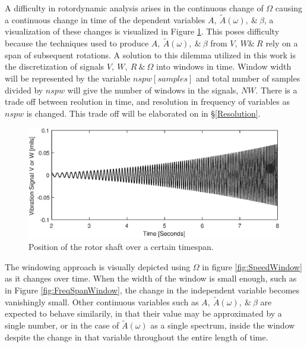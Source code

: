 A difficulty in rotordynamic analysis arises in the continuous change of $ \Omega $ causing a continuous change in time of the dependent variables $ A,\ \tilde{A}(\omega),\ \&\ \beta $, a visualization of these changes is visualized in Figure \ref{fig:PosOverTime}. This poses difficulty because the techniques used to produce $ A,\ \tilde{A}(\omega),\ \&\ \beta $ from $ V,\ W\&\ R $ rely on a span of subsequent rotations. A solution to this dilemma utilized in this work is the discretization of signals $ V,\ W,\ R\ \&\ \Omega $ into windows in time. Window width will be represented by the variable $ nspw[samples] $ and total number of samples divided by $ nspw $ will give the number of windows in the signals, $ NW $. There is a trade off between reolution in time, and resolution in frequency of variables as $ nspw $ is changed. This trade off will be elaborated on in \S\ref{Resolution}.\par 
\begin{figure}
	\centering
	\includegraphics[width=\linewidth]{./figures/Pos_Over_Time.eps}
	\caption{Position of the rotor shaft over a certain timespan.}
	\label{fig:PosOverTime}
\end{figure}
The windowing approach is visually depicted using $ \Omega $ in figure \ref{fig:SpeedWindow} as it changes over time. When the width of the window is small enough, such as in Figure \ref{fig:FreqSpanWindow}, the change in the independent variable becomes vanishingly small. Other continuous variables such as $ A,\ \tilde{A}(\omega),\ \&\ \beta $ are expected to behave similarily, in that their value may be approximated by a single number, or in the case of $ \tilde{A}(\omega) $ as a single spectrum, inside the window despite the change in that variable throughout the entire length of time.
